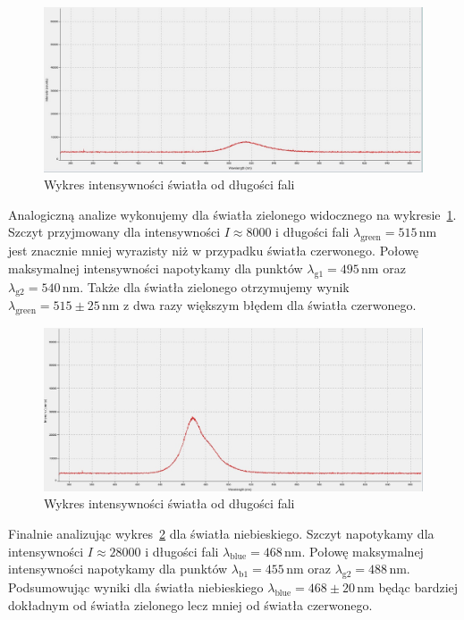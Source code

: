 \documentclass[12pt]{article}
\begin{document}
\begin{figure}[H]
	\centering
	\includegraphics[scale=0.3]{green_wavelength}
	\caption{Wykres intensywności światła od długości fali}
	\label{fig:green_wavelength}
\end{figure}
Analogiczną analize wykonujemy dla światła zielonego widocznego na wykresie~\ref{fig:green_wavelength}. Szczyt przyjmowany dla intensywności \(I \approx 8000\) i długości fali \(\lambda_{\mathrm{green}} = 515 \, \mathrm{nm}\) jest znacznie mniej wyrazisty niż w przypadku światła czerwonego. Połowę maksymalnej intensywności napotykamy dla punktów \(\lambda_{\mathrm{g1}} = 495 \, \mathrm{nm}\) oraz \(\lambda_{\mathrm{g2}} = 540 \, \mathrm{nm}\). Także dla światła zielonego otrzymujemy wynik \(\lambda_{\mathrm{green}} = 515 \pm 25 \, \mathrm{nm}\) z dwa razy większym błędem dla światła czerwonego.

\begin{figure}[H]
	\centering
	\includegraphics[scale=0.3]{blue_wavelength}
	\caption{Wykres intensywności światła od długości fali}
	\label{fig:blue_wavelength}
\end{figure}
Finalnie analizując wykres~\ref{fig:blue_wavelength} dla światła niebieskiego. Szczyt napotykamy dla intensywności \(I \approx 28000\) i długości fali \(\lambda_{\mathrm{blue}} = 468 \, \mathrm{nm}\). Połowę maksymalnej intensywności napotykamy dla punktów \(\lambda_{\mathrm{b1}} = 455 \, \mathrm{nm}\) oraz \(\lambda_{\mathrm{g2}} = 488 \, \mathrm{nm}\). Podsumowując wyniki dla światła niebieskiego \(\lambda_{\mathrm{blue}} = 468 \pm 20 \, \mathrm{nm}\) będąc bardziej dokładnym od światła zielonego lecz mniej od światła czerwonego.
\end{document}
